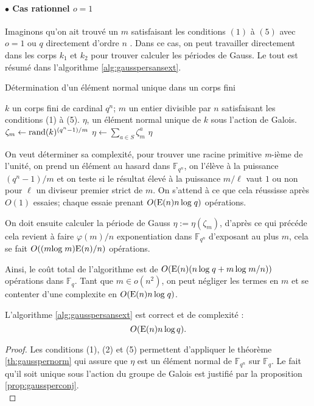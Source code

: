 \documentclass[a4paper]{article} %
\numberwithin{section}{part}
\numberwithin{equation}{section}
\newcommand\nroot[1]{\textit{#1}-ième}
\newcommand\GF[1]{\mathbb{F}_{#1}}
\newcommand\E[1]{\textup{E}(#1)}
\begin{document}
\paragraph{$\bullet$ Cas rationnel $o = 1$}
Imaginons qu'on ait trouvé un $m$ satisfaisant les conditions $(1)$ à $(5)$ avec
$o = 1$ ou $q$ directement d'ordre $n$ . Dans ce cas, on peut travailler 
directement dans les corps $k_1$ et $k_2$ pour trouver calculer les périodes de
Gauss. Le tout est résumé dans l'algorithme \ref{alg:gausspersansext}.

\begin{algorithm}
\caption{Détermination d'un élément normal unique dans un corps fini}
\label{alg:gausspersansext}
\begin{algorithmic}[1]
\REQUIRE $k$ un corps fini de cardinal $q^n$; $m$ un entier divisible par $n$
satisfaisant les conditions (1) à (5).
\ENSURE $\eta$, un élément normal unique de $k$ sous l'action de Galois.
\bigskip
\REPEAT
    \STATE $\zeta_m \leftarrow \textup{rand}(k)^{(q^n - 1)/m}$
\STATE $\eta \leftarrow \sum_{a\in S}{\zeta_m^a}$
\RETURN $\eta$
\end{algorithmic}
\end{algorithm}
On veut déterminer sa complexité, pour trouver une racine primitive 
\nroot{m} de l'unité, on prend un élément au hasard dans $\GF{q^n}$, on l'élève 
à la puissance $(q^n - 1)/m$ et on teste si le résultat élevé à la puissance 
$m/\ell$ vaut $1$ ou non pour $\ell$ un diviseur premier strict de $m$. On 
s'attend à ce que cela réussisse après $O(1)$ essaies; chaque essaie prenant 
$O(\E{n}n\,\textup{log\;}q)$ opérations.\par
On doit ensuite calculer la période de Gauss $\eta := \eta(\zeta_m)$,
d'après ce qui précéde cela revient à faire $\varphi(m)/n$ exponentiation dans
$\GF{q^n}$ d'exposant au plus $m$, cela se fait $O((m\textup{log\;}m)\E{n}/n)$
opérations.\par
Ainsi, le coût total de l'algorithme est de $O(\E{n}(n\,\textup{log\;}q +
m\,\textup{log\;}m/n))$ opérations dans $\GF{q}$. Tant que $m\in o(n^2)$, on 
peut négliger les termes en $m$ et se contenter d'une complexite en 
$O(\E{n}n\,\textup{log\;}q)$.

\begin{prop}
\label{prop:algsansext}
L'algorithme \ref{alg:gausspersansext} est correct et de complexité :
\begin{equation}
O(\E{n}n\,\textup{log\,}q).
\end{equation}
\end{prop}
\begin{proof}
Les conditions (1), (2) et (5) permettent d'appliquer le théorème 
\ref{th:gausspernorm} qui assure que $\eta$ est un élément normal de 
$\GF{q^n}$ sur $\GF{q}$. Le fait qu'il soit unique sous l'action du groupe de 
Galois est justifié par la proposition \ref{prop:gaussperconj}.\\
\end{proof}
\end{document}
